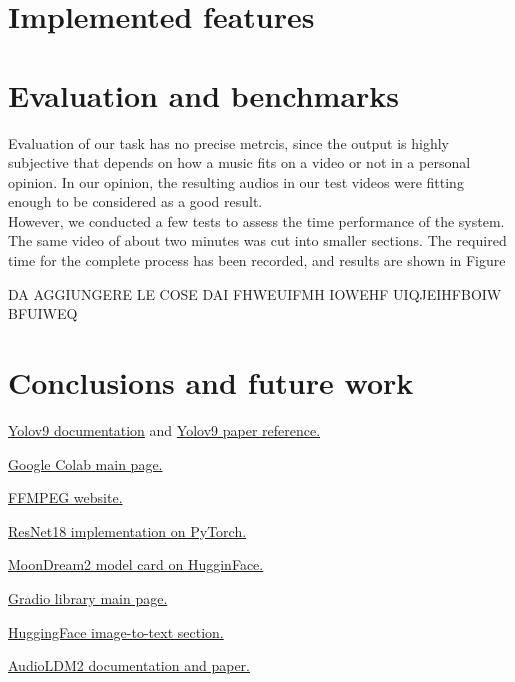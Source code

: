 \documentclass[conference]{IEEEtran}
\begin{document}
\section{Implemented features}


\section{Evaluation and benchmarks}
Evaluation of our task has no precise metrcis, since the output is highly subjective that depends on how a music fits on a video or not in a personal opinion.
In our opinion, the resulting audios in our test videos were fitting enough to be considered as a good result.\\
However, we conducted a few tests to assess the time performance of the system. The same video of about two minutes was cut into smaller sections. The required time for the complete process has been recorded, and results are shown in Figure 

DA AGGIUNGERE LE COSE DAI FHWEUIFMH IOWEHF UIQJEIHFBOIW BFUIWEQ

\section{Conclusions and future work}



\begin{thebibliography}{00}

        \href{https://docs.ultralytics.com/models/yolov9/}{Yolov9 documentation} and 
        \href{https://docs.ultralytics.com/models/yolov9/\#citations-and-acknowledgements}{Yolov9 paper reference.}
    
        \href{https://colab.research.google.com/}{Google Colab main page.}

        \href{https://ffmpeg.org}{FFMPEG website.}
    
        \href{https://pytorch.org/vision/main/models/generated/torchvision.models.resnet18.html}{ResNet18 implementation on PyTorch.}
    
        \href{https://huggingface.co/vikhyatk/moondream2}{MoonDream2 model card on HugginFace.}
    
        \href{https://www.gradio.app/}{Gradio library main page.}

     \href{https://huggingface.co/models?pipeline_tag=image-to-text&sort=trending}{HuggingFace image-to-text section.}

     \href{https://audioldm.github.io/audioldm2/}{AudioLDM2 documentation and paper.}
\end{thebibliography}
\end{document}
